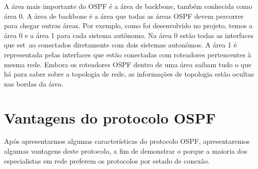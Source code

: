 \documentclass[12pt,a4paper]{report}
\begin{document}
A \'area mais importante do OSPF \'e a \'area de backbone, tamb\'em conhecida como \'area 0. A \'area de backbone \'e a \'area que todas as \'areas OSPF devem percorrer para chegar outras \'areas. Por exemplo, como foi desenvolvido no projeto, temos a \'area 0 e a \'area 1 para cada sistema aut\^onomo. Na \'area 0 est\~ao todas as interfaces que est~ao conectados diretamente com dois sistemas auton\^omos. A \'area 1 \'e representada pelas interfaces que est\~ao conectadas com roteadores pertencentes \`a mesma rede\cite{rfc2328}. Embora os roteadores OSPF dentro de uma \'area saibam tudo o que h\'a para saber sobre a topologia de rede, as informa\c{c}\~oes de topologia est\~ao ocultas nas bordas da \'area.

\section{Vantagens do protocolo OSPF}

Ap\'os apresentarmos algumas caracter\'isticas do protocolo OSPF, apresentaremos algumas vantagens deste protocolo, a fim de demonstrar o porque a maioria dos especialistas em rede preferem os protocolos por estado de conex\~ao.
\end{document}
